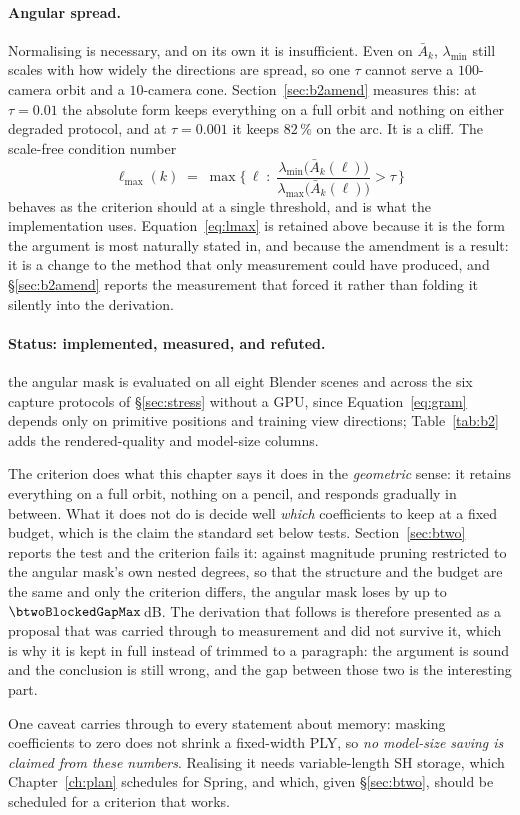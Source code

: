 \paragraph{Angular spread.} Normalising is necessary, and on its own it is insufficient. Even on
$\bar A_k$, $\lambda_{\min}$ still scales with how widely the directions are
spread, so one $\tau$ cannot serve a $100$-camera orbit and a $10$-camera cone.
Section~\ref{sec:b2amend} measures this: at $\tau = 0.01$ the absolute form keeps
everything on a full orbit and nothing on either degraded protocol, and at
$\tau = 0.001$ it keeps $82\,\%$ on the arc. It is a cliff. The scale-free condition number
\begin{equation}
  \ell_{\max}(k) \;=\; \max\Big\{\, \ell \;:\;
  \frac{\lambda_{\min}\big(\bar A_k(\ell)\big)}{\lambda_{\max}\big(\bar A_k(\ell)\big)} > \tau \,\Big\}
  \label{eq:lmaxcond}
\end{equation}
behaves as the criterion should at a single threshold, and is what the
implementation uses. Equation~\eqref{eq:lmax} is retained above because it is
the form the argument is most naturally stated in, and because the amendment is
a result: it is a change to the method that only measurement could have
produced, and \S\ref{sec:b2amend} reports the measurement that forced it rather
than folding it silently into the derivation.

\paragraph{Status: implemented, measured, and refuted.} the angular mask is evaluated on all
eight Blender scenes and across the six capture protocols of
\S\ref{sec:stress} without a GPU, since Equation~\eqref{eq:gram} depends only on
primitive positions and training view directions; Table~\ref{tab:b2} adds the
rendered-quality and model-size columns.

The criterion does what this chapter says it does in the \emph{geometric}
sense: it retains everything on a full orbit, nothing on a pencil, and responds
gradually in between. What it does not do is decide well \emph{which} coefficients to keep at a fixed budget, which is the claim the
standard set below tests. Section~\ref{sec:btwo} reports the test and the criterion
fails it: against magnitude pruning restricted to the angular mask's own nested degrees, so that the structure and the budget are
the same and only the criterion differs, the angular mask loses by up to
$\btwoBlockedGapMax$\,dB. The derivation that follows is therefore presented as
a proposal that was carried through to measurement and did not survive it, which
is why it is kept in full instead of trimmed to a paragraph: the
argument is sound and the conclusion is still wrong, and the gap between those
two is the interesting part.

One caveat carries through to every statement about memory: masking coefficients
to zero does not shrink a fixed-width PLY, so \emph{no model-size saving is
claimed from these numbers}. Realising it needs variable-length SH storage,
which Chapter~\ref{ch:plan} schedules for Spring, and which, given
\S\ref{sec:btwo}, should be scheduled for a criterion that works.